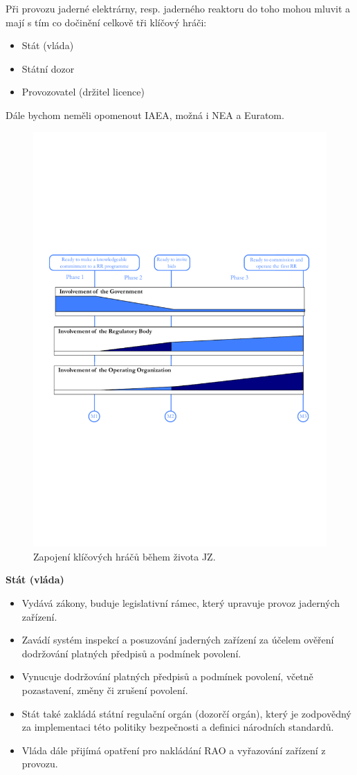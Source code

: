 Při provozu jaderné elektrárny, resp. jaderného reaktoru do toho mohou mluvit a mají s tím co dočinění celkově tři klíčový hráči:

\begin{itemize}
    \item Stát (vláda)
    \item Státní dozor
    \item Provozovatel (držitel licence)
\end{itemize}

Dále bychom neměli opomenout IAEA, možná i NEA a Euratom.

\begin{figure}[H]
    \centering
    \includegraphics[width=0.7\linewidth,trim={1cm 8cm 1cm 8cm}, clip]{img/zapojeni_klicovych_hracu.pdf}
    \caption{Zapojení klíčových hráčů během života JZ.}
    \label{fig:2_15_zapojeni_klicovych_hracu}
\end{figure}

\textbf{Stát (vláda)}

\begin{itemize}
    \item Vydává zákony, buduje legislativní rámec, který upravuje provoz jaderných zařízení.
    \item Zavádí systém inspekcí a posuzování jaderných zařízení za účelem ověření dodržování platných předpisů a podmínek povolení.
    \item Vynucuje dodržování platných předpisů a podmínek povolení, včetně pozastavení, změny či zrušení povolení.
    \item Stát také zakládá státní regulační orgán (dozorčí orgán), který je zodpovědný za implementaci této politiky bezpečnosti a definici národních standardů.
    \item Vláda dále přijímá opatření pro nakládání RAO a vyřazování zařízení z provozu.
\end{itemize}

